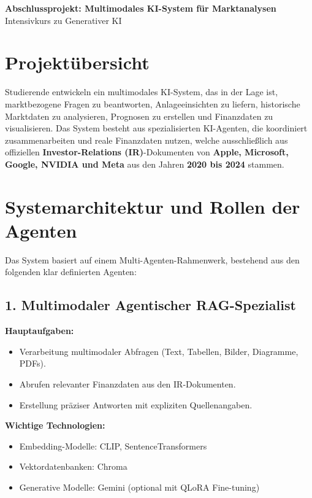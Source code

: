 \documentclass[12pt,a4paper]{article}
\begin{document}
\begin{center}
    \LARGE\textbf{Abschlussprojekt: Multimodales KI-System für Marktanalysen}\\[0.5cm]
    \large Intensivkurs zu Generativer KI \\[0.3cm]
\end{center}

\section*{Projektübersicht}

Studierende entwickeln ein multimodales KI-System, das in der Lage ist, marktbezogene Fragen zu beantworten, Anlageeinsichten zu liefern, historische Marktdaten zu analysieren, Prognosen zu erstellen und Finanzdaten zu visualisieren. Das System besteht aus spezialisierten KI-Agenten, die koordiniert zusammenarbeiten und reale Finanzdaten nutzen, welche ausschließlich aus offiziellen \textbf{Investor-Relations (IR)}-Dokumenten von \textbf{Apple, Microsoft, Google, NVIDIA und Meta} aus den Jahren \textbf{2020 bis 2024} stammen.

\section*{Systemarchitektur und Rollen der Agenten}

Das System basiert auf einem Multi-Agenten-Rahmenwerk, bestehend aus den folgenden klar definierten Agenten:

\subsection*{1. Multimodaler Agentischer RAG-Spezialist}

\textbf{Hauptaufgaben:}
\begin{itemize}[noitemsep]
    \item Verarbeitung multimodaler Abfragen (Text, Tabellen, Bilder, Diagramme, PDFs).
    \item Abrufen relevanter Finanzdaten aus den IR-Dokumenten.
    \item Erstellung präziser Antworten mit expliziten Quellenangaben.
\end{itemize}

\textbf{Wichtige Technologien:}
\begin{itemize}[noitemsep]
    \item Embedding-Modelle: CLIP, SentenceTransformers
    \item Vektordatenbanken: Chroma
    \item Generative Modelle: Gemini (optional mit QLoRA Fine-tuning)
\end{itemize}
\end{document}
